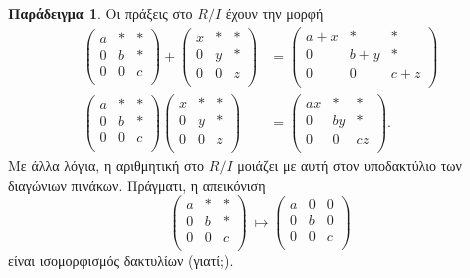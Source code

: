 \documentclass[12pt,a4paper,reqno]{amsart}
\theoremstyle{definition}
\newtheorem{example}[theorem]{Παράδειγμα}
\theoremstyle{remark}
\numberwithin{theorem}{section}
\numberwithin{exercise}{section}
\numberwithin{equation}{section}
\begin{document}
\begin{example}
Οι πράξεις στο $R/I$ έχουν την μορφή 
\begin{align*}
    \begin{pmatrix}
        a & \ast & \ast \\
        0 & b    & \ast \\
        0 & 0    & c \\
    \end{pmatrix}
    +
    \begin{pmatrix}
        x & \ast & \ast \\
        0 & y    & \ast \\
        0 & 0    & z \\
    \end{pmatrix} &=
    \begin{pmatrix}
        a + x & \ast & \ast \\
        0     & b+y  & \ast \\
        0     & 0    & c+z \\
    \end{pmatrix} \\
    \begin{pmatrix}
        a & \ast & \ast \\
        0 & b    & \ast \\
        0 & 0    & c \\
    \end{pmatrix}
    \begin{pmatrix}
        x & \ast & \ast \\
        0 & y    & \ast \\
        0 & 0    & z \\
    \end{pmatrix} &=
    \begin{pmatrix}
        ax & \ast & \ast \\
        0  & by  & \ast \\
        0  & 0    & cz \\
    \end{pmatrix}.
\end{align*}
Με άλλα λόγια, η αριθμητική στο $R/I$ μοιάζει με αυτή στον υποδακτύλιο των διαγώνιων πινάκων. Πράγματι, η απεικόνιση 
\[
\begin{pmatrix}
        a & \ast & \ast \\
        0 & b    & \ast \\
        0 & 0    & c \\
    \end{pmatrix} \ \mapsto 
    \begin{pmatrix}
        a & 0 & 0 \\
        0 & b & 0 \\
        0 & 0 & c \\
    \end{pmatrix}
\]
είναι ισομορφισμός δακτυλίων (γιατί;).


\end{example}
\end{document}
